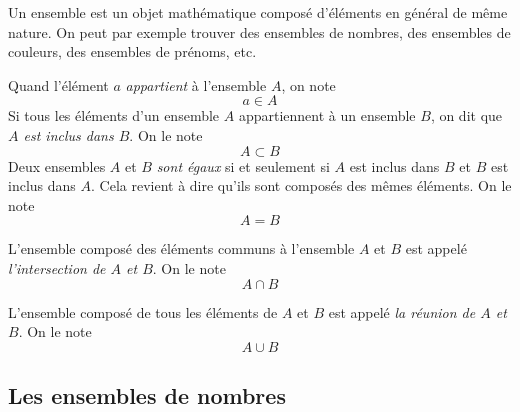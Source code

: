 Un ensemble est un objet mathématique composé d'éléments en général de même nature. On peut par exemple trouver des ensembles de nombres, des ensembles de couleurs, des ensembles de prénoms, etc.

Quand l'élément $a$ \emph{appartient} à l'ensemble $A$, on note
$$
a\in A
$$
Si tous les éléments d'un ensemble $A$ appartiennent à un ensemble $B$, on dit que \emph{$A$ est inclus dans $B$}. On le note
$$
A \subset B
$$
Deux ensembles $A$ et $B$ \emph{sont égaux} si et seulement si $A$ est inclus dans $B$ et $B$ est inclus dans $A$. Cela revient à dire qu'ils sont composés des mêmes éléments. On le note 
$$
A=B
$$

L'ensemble composé des éléments communs à l'ensemble $A$ et $B$ est appelé \emph{l'intersection de $A$ et $B$}. On le note
$$
A\cap B
$$

L'ensemble composé de tous les éléments de $A$ et $B$ est appelé \emph{la réunion de $A$ et $B$}. On le note
$$
A\cup B
$$

\subsection{Les ensembles de nombres}


